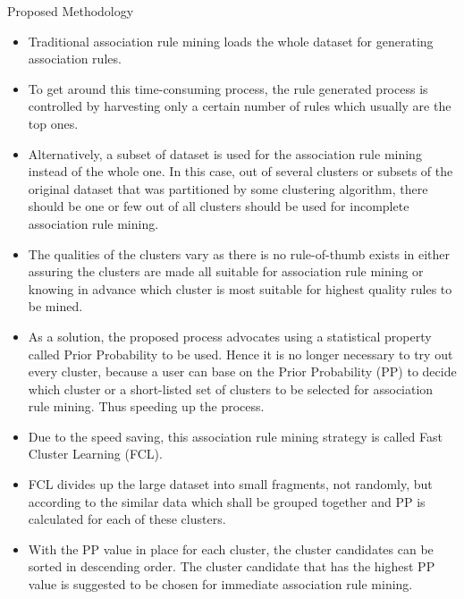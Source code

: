 \documentclass{beamer}
\begin{document}
\begin{frame}{Proposed Methodology}
    \begin{itemize}
        \item Traditional association rule mining loads the whole 
dataset for generating association rules. 
\item To get around this time-consuming process, the rule generated 
process is controlled by harvesting only a certain number of rules which usually are the top ones.
\item Alternatively, a subset of dataset is used for the association 
rule mining instead of the whole one. In this case, out of 
several clusters or subsets of the original dataset that was 
partitioned by some clustering algorithm, there should be 
one or few out of all clusters should be used for incomplete 
association rule mining.
\item The qualities of the clusters vary as there is 
no rule-of-thumb exists in either assuring the clusters are 
made all suitable for association rule mining or knowing in 
advance which cluster is most suitable for highest quality 
rules to be mined.
    \end{itemize}
\end{frame}

\begin{frame}
\begin{itemize}
    \item As a solution, the proposed process advocates using a statistical property called Prior Probability to be used. Hence it is no longer necessary to try out every cluster, because a user can base on the Prior Probability (PP) to 
decide which cluster or a short-listed set of clusters to be 
selected for association rule mining. Thus speeding up the process.
\item Due to the speed saving, this association rule 
mining strategy is called Fast Cluster Learning (FCL). 
\item FCL divides up the large dataset into small fragments, not randomly, but according to the similar data which shall be grouped together and PP is calculated for each of these clusters.
\item With the PP value in place for each cluster, the cluster 
candidates can be sorted in descending order. The cluster 
candidate that has the highest PP value is suggested to be 
chosen for immediate association rule mining.
\end{itemize}
\end{frame}
\end{document}
